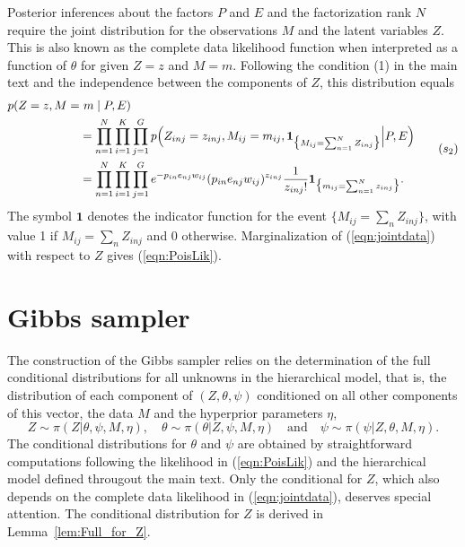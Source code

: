 \documentclass[11pt]{amsart}
\theoremstyle{definition}
\begin{document}
Posterior inferences about the factors $P$ and $E$ and the
factorization rank $N$ require the joint distribution for the
observations $M$ and the latent variables $Z$. This is also known as
the complete data likelihood function when interpreted as a function
of  $\theta$ for given $Z=z$ and $M=m$. Following the condition 
(1) in the main text and the independence between
the components of $Z$, this distribution equals
\begin{equation}
   \label{eqn:jointdata}
 \begin{aligned}
    p(Z = z, M =&\ m \mid P, E) \notag\\
  &= 
    \prod_{n=1}^N\prod_{i=1}^K\prod_{j=1}^G p\Big(Z_{inj} = z_{inj},
    M_{ij} = m_{ij}, \mathbf{1}_{\big\{M_{ij} = \sum_{n=1}^N
      Z_{inj}\big\}} \Big| P, E\Big)  \notag\\ 
  &=
    \prod_{n=1}^N\prod_{i=1}^K\prod_{j=1}^G e^{-p_{in}e_{nj}w_{ij}}
    (p_{in}e_{nj}w_{ij})^{z_{inj}} \frac{1}{z_{inj}!}
    \mathbf{1}_{\big\{m_{ij} = \sum_{n=1}^N z_{inj}\big\}}.
 \end{aligned}
 \tag{$s_2$}
\end{equation}
The symbol $\mathbf{1}$ denotes the indicator function for the  
event $\big\{M_{ij} = \sum_n Z_{inj}\big\}$, with value 1 if $M_{ij} =  
\sum_n  Z_{inj}$ and 0 otherwise. Marginalization of
(\ref{eqn:jointdata}) with respect to $Z$ gives  (\ref{eqn:PoisLik}).


\section{Gibbs sampler}
\label{sec:Gibbs}
The construction of the Gibbs sampler relies on the determination of
the full conditional distributions for all unknowns in the
hierarchical model, that is, the distribution of each component of
$(Z, \theta, \psi)$ conditioned on all other components of this vector,
the data $M$ and the hyperprior parameters $\eta$,
\[
   Z \sim \pi(Z|\theta, \psi, M, \eta), \quad
   \theta \sim \pi(\theta|Z, \psi, M, \eta) \quad
  \text{and}\quad
  \psi \sim \pi(\psi|Z, \theta, M, \eta).
\]
The conditional distributions for $\theta$ and $\psi$ are obtained by
straightforward computations following the likelihood in
(\ref{eqn:PoisLik}) and the hierarchical model defined througout the
main text. Only the conditional for $Z$, which also depends on the
complete data likelihood in (\ref{eqn:jointdata}), deserves special
attention. The conditional distribution for $Z$ is derived in
Lemma~\ref{lem:Full_for_Z}.
\end{document}
